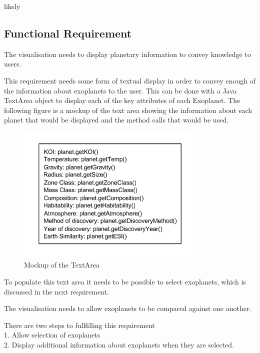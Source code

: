 likely

\subsection{Functional Requirement}
\begin{enumerate}
{\bf
 \item[R1.] The visualisation needs to display planetary information to convey
knowledge to users.
}

  This requirement needs some form of textual display in order to convey enough
of the information about exoplanets to the user. This can be done with a Java
TextArea object to display each of the key
attributes of each Exoplanet. The following figure is a mockup of the text area
showing the information about each planet that would be displayed and the method
calls that would be used.

\begin{figure}[H]
  \centering
      \includegraphics[width=0.8\textwidth]{images/textAreaMockup.png}
  \caption{Mockup of the TextArea}  
\end{figure}

To populate this text area it needs to be possible to select exoplanets, which
is discussed in the next requirement.

{\bf
 \item[R2.] The visualisation needs to allow exoplanets to be compared against
one another.}

There are two steps to fullfilling this requirement\\ 1. Allow selection of
exoplanets \\ 2. Display additional information about exoplanets when they are
selected.


\end{enumerate}
